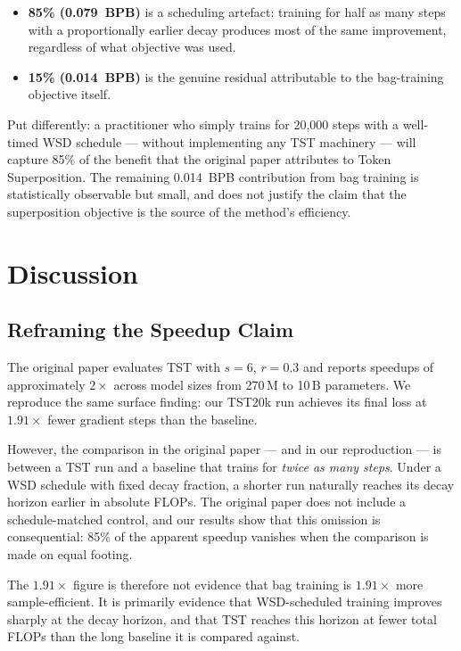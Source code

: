 \documentclass{article}
\begin{document}
\begin{itemize}
    \item \textbf{85\% (0.079~BPB)} is a scheduling artefact: training for half
    as many steps with a proportionally earlier decay produces most of the
    same improvement, regardless of what objective was used.
    \item \textbf{15\% (0.014~BPB)} is the genuine residual attributable to the
    bag-training objective itself.
\end{itemize}

Put differently: a practitioner who simply trains for 20{,}000 steps with a
well-timed WSD schedule — without implementing any TST machinery — will
capture 85\% of the benefit that the original paper attributes to Token Superposition.
The remaining 0.014~BPB contribution from bag training is statistically observable
but small, and does not justify the claim that the superposition objective is the
source of the method's efficiency.

\section{Discussion}

\subsection{Reframing the Speedup Claim}

The original paper evaluates TST with $s=6$, $r=0.3$ and reports speedups of
approximately $2\times$ across model sizes from 270\,M to 10\,B parameters.
We reproduce the same surface finding: our TST20k run achieves its final loss at
$1.91\times$ fewer gradient steps than the baseline.

However, the comparison in the original paper — and in our reproduction — is between
a TST run and a baseline that trains for \emph{twice as many steps}.
Under a WSD schedule with fixed decay fraction, a shorter run naturally reaches its
decay horizon earlier in absolute FLOPs.
The original paper does not include a schedule-matched control, and our results
show that this omission is consequential: 85\% of the apparent speedup vanishes
when the comparison is made on equal footing.

The $1.91\times$ figure is therefore not evidence that bag training is $1.91\times$
more sample-efficient.
It is primarily evidence that WSD-scheduled training improves sharply at the decay
horizon, and that TST reaches this horizon at fewer total FLOPs than the long
baseline it is compared against.
\end{document}
